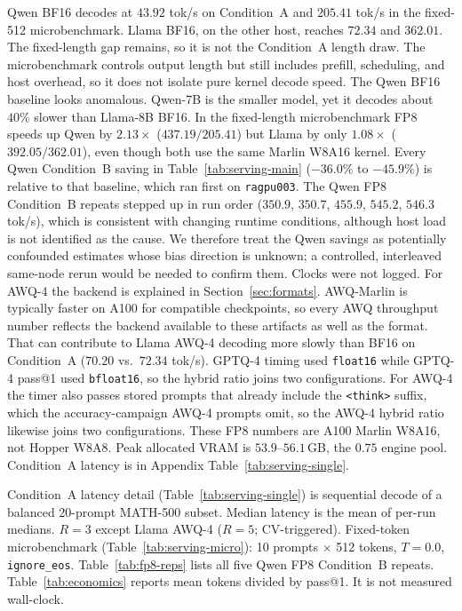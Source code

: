 \documentclass[11pt,a4paper]{article}
\begin{document}
Qwen BF16 decodes at $43.92$ tok/s on Condition~A and $205.41$ tok/s in the fixed-512 microbenchmark. Llama BF16, on the other host, reaches $72.34$ and $362.01$. The fixed-length gap remains, so it is not the Condition~A length draw. The microbenchmark controls output length but still includes prefill, scheduling, and host overhead, so it does not isolate pure kernel decode speed. The Qwen BF16 baseline looks anomalous. Qwen-7B is the smaller model, yet it decodes about $40\%$ slower than Llama-8B BF16. In the fixed-length microbenchmark FP8 speeds up Qwen by $2.13\times$ ($437.19/205.41$) but Llama by only $1.08\times$ ($392.05/362.01$), even though both use the same Marlin W8A16 kernel. Every Qwen Condition~B saving in Table~\ref{tab:serving-main} ($-36.0\%$ to $-45.9\%$) is relative to that baseline, which ran first on \texttt{ragpu003}. The Qwen FP8 Condition~B repeats stepped up in run order ($350.9$, $350.7$, $455.9$, $545.2$, $546.3$ tok/s), which is consistent with changing runtime conditions, although host load is not identified as the cause. We therefore treat the Qwen savings as potentially confounded estimates whose bias direction is unknown; a controlled, interleaved same-node rerun would be needed to confirm them. Clocks were not logged. For AWQ-4 the backend is explained in Section~\ref{sec:formats}. AWQ-Marlin is typically faster on A100 for compatible checkpoints, so every AWQ throughput number reflects the backend available to these artifacts as well as the format. That can contribute to Llama AWQ-4 decoding more slowly than BF16 on Condition~A ($70.20$ vs.\ $72.34$ tok/s). GPTQ-4 timing used \texttt{float16} while GPTQ-4 pass@1 used \texttt{bfloat16}, so the hybrid ratio joins two configurations. For AWQ-4 the timer also passes stored prompts that already include the \texttt{<think>} suffix, which the accuracy-campaign AWQ-4 prompts omit, so the AWQ-4 hybrid ratio likewise joins two configurations. These FP8 numbers are A100 Marlin W8A16, not Hopper W8A8. Peak allocated VRAM is $53.9$--$56.1$\,GB, the $0.75$ engine pool. Condition~A latency is in Appendix Table~\ref{tab:serving-single}.

Condition~A latency detail (Table~\ref{tab:serving-single}) is sequential decode of a balanced 20-prompt MATH-500 subset. Median latency is the mean of per-run medians. $R=3$ except Llama AWQ-4 ($R=5$; CV-triggered). Fixed-token microbenchmark (Table~\ref{tab:serving-micro}): 10 prompts $\times$ 512 tokens, $T=0.0$, \texttt{ignore\_eos}. Table~\ref{tab:fp8-reps} lists all five Qwen FP8 Condition~B repeats. Table~\ref{tab:economics} reports mean tokens divided by pass@1. It is not measured wall-clock.
\end{document}
